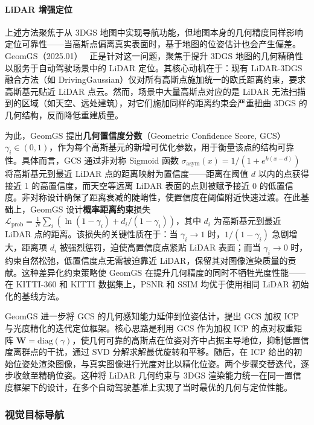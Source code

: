 \paragraph{LiDAR 增强定位}

上述方法聚焦于从 3DGS 地图中实现导航功能，但地图本身的几何精度同样影响定位可靠性——当高斯点偏离真实表面时，基于地图的位姿估计也会产生偏差。GeomGS（2025.01）~\cite{2501_13417} 正是针对这一问题，聚焦于提升 3DGS 地图的几何精确性以服务于自动驾驶场景中的 LiDAR 定位。其核心动机在于：现有 LiDAR-3DGS 融合方法（如 DrivingGaussian）仅对所有高斯点施加统一的欧氏距离约束，要求高斯基元贴近 LiDAR 点云。然而，场景中大量高斯点对应的是 LiDAR 无法扫描到的区域（如天空、远处建筑），对它们施加同样的距离约束会严重扭曲 3DGS 的几何结构，反而降低重建质量。

为此，GeomGS 提出\textbf{几何置信度分数}（Geometric Confidence Score, GCS）$\gamma_i \in (0,1)$，作为每个高斯基元的新增可优化参数，用于衡量该点的结构可靠性。具体而言，GCS 通过非对称 Sigmoid 函数 $\sigma_{\text{asym}}(x) = 1/(1 + e^{k(x-d)})$ 将高斯基元到最近 LiDAR 点的距离映射为置信度——距离在阈值 $d$ 以内的点获得接近 1 的高置信度，而天空等远离 LiDAR 表面的点则被赋予接近 0 的低置信度。非对称设计确保了距离衰减的陡峭性，使置信度在阈值附近快速过渡。在此基础上，GeomGS 设计\textbf{概率距离约束}损失 $\mathcal{L}_{\text{prob}} = \frac{1}{N}\sum_{i}(\ln(1-\gamma_i) + d_i/(1-\gamma_i))$，其中 $d_i$ 为高斯基元到最近 LiDAR 点的距离。该损失的关键性质在于：当 $\gamma_i \to 1$ 时，$1/(1-\gamma_i)$ 急剧增大，距离项 $d_i$ 被强烈惩罚，迫使高置信度点紧贴 LiDAR 表面；而当 $\gamma_i \to 0$ 时，约束自然松弛，低置信度点无需被迫靠近 LiDAR，保留其对图像渲染质量的贡献。这种差异化约束策略使 GeomGS 在提升几何精度的同时不牺牲光度性能——在 KITTI-360 和 KITTI 数据集上，PSNR 和 SSIM 均优于使用相同 LiDAR 初始化的基线方法。

GeomGS 进一步将 GCS 的几何感知能力延伸到位姿估计，提出 GCS 加权 ICP 与光度精化的迭代定位框架。核心思路是利用 GCS 作为加权 ICP 的点对权重矩阵 $\mathbf{W}=\text{diag}(\gamma)$，使几何可靠的高斯点在位姿对齐中占据主导地位，抑制低置信度离群点的干扰，通过 SVD 分解求解最优旋转和平移。随后，在 ICP 给出的初始位姿处渲染图像，与真实图像进行光度对比以精化位姿。两个步骤交替迭代，逐步收敛至精确位姿。这种将 LiDAR 几何约束与 3DGS 渲染能力统一在同一置信度框架下的设计，在多个自动驾驶基准上实现了当时最优的几何与定位性能。

\subsubsection{视觉目标导航}

